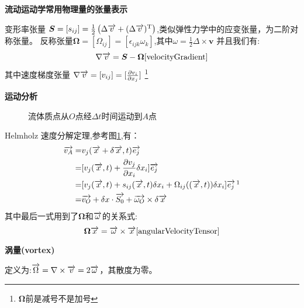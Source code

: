 \textbf{流动运动学常用物理量的张量表示}

变形率张量
$\bm{S}=[s_{ij}]=\frac{1}{2}\left(\Delta \overrightarrow{v}+(\Delta \overrightarrow{v})^{\mathrm{T}}\right)$,类似弹性力学中的应变张量，为二阶对称张量。
反称张量$\bm{\Omega}=[\Omega_{ij}]=[\epsilon_{ijk}\omega_k]$,其中$\omega=\frac{1}{2}\Delta \times \bm{v}$
并且我们有:
\begin{equation}\label{eq:w31AS}
\nabla \overrightarrow{v}=\bm{S}-\bm{\Omega}\cite{velocityGradient}
\end{equation}
其中速度梯度张量 $\nabla \overrightarrow{v}=[v_{ij}]=[\frac{\partial v_i}{\partial x_j}]$
\footnote{$\bm{\Omega}$前是减号不是加号}

\textbf{运动分析}

\begin{figure}[!ht]%
\centering
%
\caption{流体质点从$O$点经$\Delta t$时间运动到$A$点}\label{fig:311}
\end{figure}

Helmholz 速度分解定理,参考图\ref{fig:311},有：
\begin{align}
\v{v_{A}} = & v_j(\v{x}+\delta \v{x},t)\v{e_j}\\
=& [v_j(\v{x},t)+\frac{\partial v_j}{\partial x_i}\delta x_i]\v{e_j}\\
=& [v_j(\v{x},t)+s_{ij}(\v{x},t)\delta x_i+\Omega_{ij}((\v{x},t))\delta x_i]\v{e_j}\,\footnotemark\\
=& \v{v_O} + \delta x \cdot \v{S_0} + \v{\omega_O}\times \delta \v{x}
\end{align}
其中最后一式用到了$\bm{\Omega}$和$\overrightarrow{\omega}$的关系式:
\begin{equation}
\bm{\Omega} \overrightarrow{x}= \overrightarrow{\omega}\times \overrightarrow{x} \cite{angularVelocityTensor}
\end{equation}


\textbf{涡量(vortex)}

定义为:$\overrightarrow{\Omega}=\nabla \times \overrightarrow{v}=2\overrightarrow{\omega}$，其散度为零。

